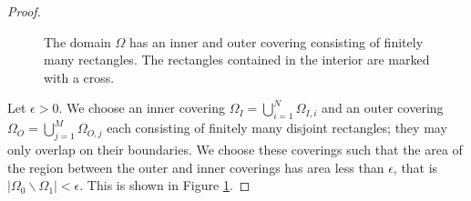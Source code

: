 \documentclass{amsart}
\theoremstyle{definition}
\begin{document}
\begin{proof}
\begin{figure}
    \caption{The domain $\Omega$ has an inner and outer covering consisting of finitely many rectangles. The rectangles contained in the interior are marked with a cross.}
    \label{fig:inner_outer_covering_rectangles}
\end{figure}

    Let $\epsilon > 0$.  We choose an inner covering $\Omega_I = \bigcup_{i=1}^N \Omega_{I,i}$ and an outer covering $\Omega_O = \bigcup_{j=1}^M \Omega_{O,j}$ each consisting of finitely many disjoint rectangles; they may only overlap on their boundaries. We choose these coverings such that the area of the region between the outer and inner coverings has area less than $\epsilon$, that is $|\Omega_0 \backslash \Omega_1| < \epsilon$.  This is shown in Figure \ref{fig:inner_outer_covering_rectangles}.
        

\end{proof}
\end{document}
